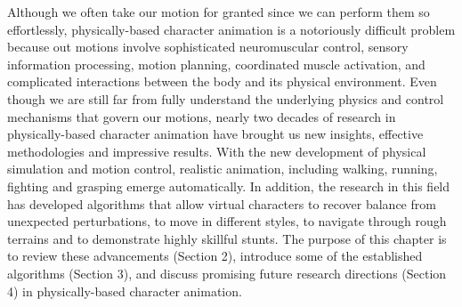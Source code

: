 Although we often take our motion for granted since we can perform them so effortlessly, physically-based character animation is a notoriously difficult problem because out motions involve sophisticated neuromuscular control, sensory information processing, motion planning, coordinated muscle activation, and complicated interactions between the body and its physical environment. Even though we are still far from fully understand the underlying physics and control mechanisms that govern our motions, nearly two decades of research in physically-based character animation have brought us new insights, effective methodologies and impressive results. With the new development of physical simulation and motion control, realistic animation, including walking, running, fighting and grasping emerge automatically. In addition, the research in this field has developed algorithms that allow virtual characters to recover balance from unexpected perturbations, to move in different styles, to navigate through rough terrains and to demonstrate highly skillful stunts. The purpose of this chapter is to review these advancements (Section 2), introduce some of the established algorithms (Section 3), and discuss promising future research directions (Section 4) in physically-based character animation.

